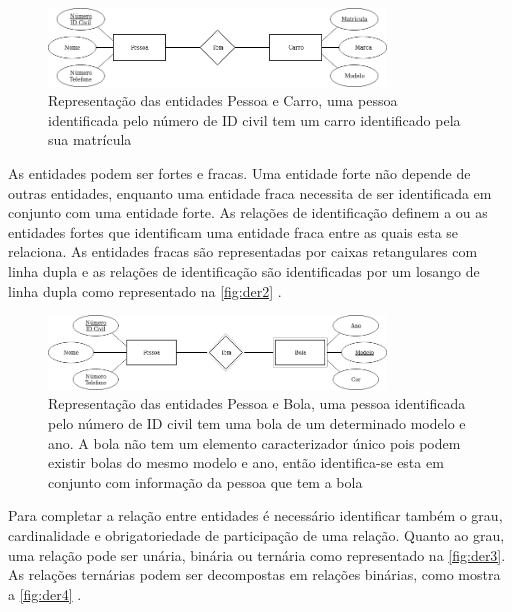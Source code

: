 \documentclass[11pt,twoside,a4paper]{report}
\begin{document}
\begin{figure}[H]
	\begin{center}
		\includegraphics[width=0.8\textwidth]{notacao1} %
		\caption[Representação de entidades, relações e atributos]{Representação das entidades Pessoa e Carro, uma pessoa identificada pelo número de ID civil tem um carro identificado pela sua matrícula}
		\label{fig:der1}
	\end{center}
\end{figure}
As entidades podem ser fortes e fracas. Uma entidade forte não depende de outras entidades, enquanto uma entidade fraca necessita de ser identificada em conjunto com uma entidade forte. As relações de identificação definem a ou as entidades fortes que identificam uma entidade fraca entre as quais esta se relaciona. As entidades fracas são representadas por caixas retangulares com linha dupla e as relações de identificação são identificadas por um losango de linha dupla como representado na \autoref{fig:der2} \cite{analise_requisitos}.
\begin{figure}[H]
	\begin{center}
		\includegraphics[width=0.8\textwidth]{notacao2} %
		\caption[Representação de entidades fortes e fracas e relação de identificação]{Representação das entidades Pessoa e Bola, uma pessoa identificada pelo número de ID civil tem uma bola de um determinado modelo e ano. A bola não tem um elemento caracterizador único pois podem existir bolas do mesmo modelo e ano, então identifica-se esta em conjunto com informação da pessoa que tem a bola}
		\label{fig:der2}
	\end{center}
\end{figure}
\newpage
Para completar a relação entre entidades é necessário identificar também o grau, cardinalidade e obrigatoriedade de participação de uma relação. Quanto ao grau, uma relação pode ser unária, binária ou ternária como representado na \autoref{fig:der3}. As relações ternárias podem ser decompostas em relações binárias, como mostra a \autoref{fig:der4} \cite{analise_requisitos}.
\end{document}
